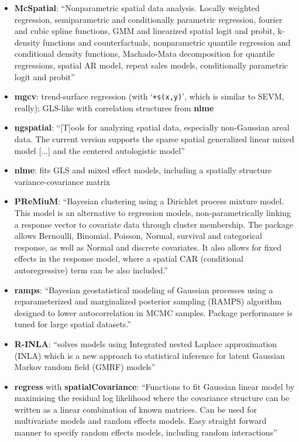 \documentclass[11pt]{article}
\begin{document}
\begin{itemize}
\item \textbf{McSpatial}: ``Nonparametric spatial data analysis. Locally weighted regression, semiparametric and conditionally parametric regression, fourier and cubic spline functions, GMM and linearized spatial logit and probit, k-density functions and counterfactuals, nonparametric quantile regression and conditional density functions, Machado-Mata decomposition for quantile regressions, spatial AR model, repeat sales models, conditionally parametric logit and probit''
\item \textbf{mgcv}: trend-surface regression (with `\texttt{+s(x,y)}', which is similar to SEVM, really); GLS-like with correlation structures from \textbf{nlme}
\item \textbf{ngspatial}: ``[T]ools for analyzing spatial data, especially non-Gaussian areal data. The current version supports the sparse spatial generalized linear mixed model [...] and the centered autologistic model''
\item \textbf{nlme}: fits GLS and mixed effect models, including a spatially structure variance-covariance matrix
\item \textbf{PReMiuM}: ``Bayesian clustering using a Dirichlet process mixture model. This model is an alternative to regression models, non-parametrically linking a response vector to covariate data through cluster membership. The package allows Bernoulli, Binomial, Poisson, Normal, survival and categorical response, as well as Normal and discrete covariates. It also allows for fixed effects in the response model, where a spatial CAR (conditional autoregressive) term can be also included.''
\item \textbf{ramps}: ``Bayesian geostatistical modeling of Gaussian processes using a reparameterized and marginalized posterior sampling (RAMPS) algorithm designed to lower autocorrelation in MCMC samples. Package performance is tuned for large spatial datasets.''
\item \textbf{R-INLA}: ``solves models using Integrated nested Laplace approximation (INLA) which is a new approach to statistical inference for latent Gaussian Markov random field (GMRF) models''
\item \textbf{regress} with \textbf{spatialCovariance}: ``Functions to fit Gaussian linear model by maximising the residual log likelihood where the covariance structure can be written as a linear combination of known matrices. Can be used for multivariate models and random effects models. Easy straight forward manner to specify random effects models, including random interactions''

\end{itemize}
\end{document}
